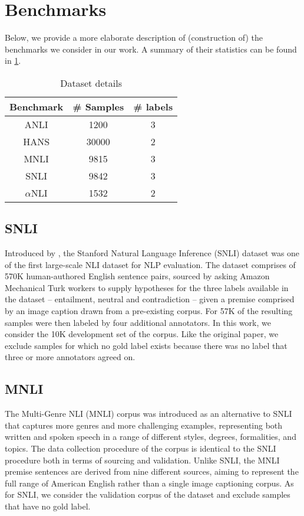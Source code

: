 \section{Benchmarks}
\label{app:benchmarks}

Below, we provide a more elaborate description of (construction of) the benchmarks we consider in our work.
A summary of their statistics can be found in \cref{tab:dataset}.

\begin{table}
\centering
\begin{tabular}{c|c|c}
    Benchmark & \# Samples & \# labels \\
    \hline
    ANLI & 1200 & 3 \\
    HANS & 30000 & 2 \\
    MNLI & 9815 & 3 \\
    SNLI & 9842 & 3 \\
    $\alpha$NLI & 1532 & 2 \\
\end{tabular}
\caption{Dataset details}
\label{tab:dataset}
\end{table}

\subsection{SNLI}
Introduced by \citet{bowman-etal-2015-large}, the Stanford Natural Language Inference (SNLI) dataset was one of the first large-scale NLI dataset for NLP evaluation.
The dataset comprises of 570K human-authored English sentence pairs, sourced by asking Amazon Mechanical Turk workers to supply hypotheses for the three labels available in the dataset -- entailment, neutral and contradiction -- given a premise comprised by an image caption drawn from a pre-existing corpus.
For 57K of the resulting samples were then labeled by four additional annotators.
In this work, we consider the 10K development set of the corpus.
Like the original paper, we exclude samples for which no gold label exists because there was no label that three or more annotators agreed on.

\subsection{MNLI}
The Multi-Genre NLI (MNLI) corpus \citep{williams-etal-2018-broad} was introduced as an alternative to SNLI that captures more genres and more challenging examples, representing both written and spoken speech in a range of different styles, degrees, formalities, and topics.
The data collection procedure of the corpus is identical to the SNLI procedure both in terms of sourcing and validation.
Unlike SNLI, the MNLI premise sentences are derived from nine different sources, aiming to represent the full range of American English rather than a single image captioning corpus.
As for SNLI, we consider the validation corpus of the dataset and exclude samples that have no gold label.

